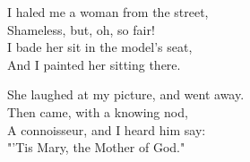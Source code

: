 
\begin{poemblock}
I haled me a woman from the street,\\
\idt Shameless, but, oh, so fair!\\
I bade her sit in the model's seat,\\
\idt And I painted her sitting there.


She laughed at my picture, and went away.\\
\idt Then came, with a knowing nod,\\
A connoisseur, and I heard him say:\\
\idt "'Tis Mary, the Mother of God."

\end{poemblock}
